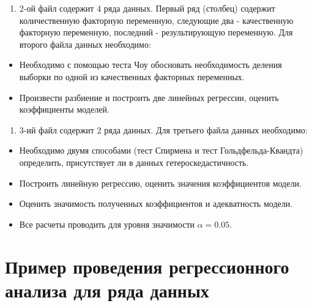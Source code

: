 \documentclass[
]{article}
\providecommand{\tightlist}{%
  \setlength{\itemsep}{0pt}\setlength{\parskip}{0pt}}
\begin{document}
\begin{enumerate}
\def\labelenumi{\arabic{enumi}.}
\setcounter{enumi}{1}
\tightlist
\item
  2-ой файл содержит 4 ряда данных. Первый ряд (столбец) содержит
  количественную факторную переменную, следующие два - качественную
  факторную переменную, последний - результирующую переменную. Для
  второго файла данных необходимо:
\end{enumerate}

\begin{itemize}
\item
  Необходимо с помощью теста Чоу обосновать необходимость деления
  выборки по одной из качественных факторных переменных.
\item
  Произвести разбиение и построить две линейных регрессии, оценить
  коэффициенты моделей.
\end{itemize}

\begin{enumerate}
\def\labelenumi{\arabic{enumi}.}
\setcounter{enumi}{2}
\tightlist
\item
  3-ий файл содержит 2 ряда данных. Для третьего файла данных
  необходимо:
\end{enumerate}

\begin{itemize}
\item
  Необходимо двумя способами (тест Спирмена и тест Гольдфельда-Квандта)
  определить, присутствует ли в данных гетероскедастичность.
\item
  Построить линейную регрессию, оценить значения коэффициентов модели.
\item
  Оценить значимость полученных коэффициентов и адекватность модели.
\item
  Все расчеты проводить для уровня значимости \(\alpha = 0.05\).
\end{itemize}

\hypertarget{ux43fux440ux438ux43cux435ux440-ux43fux440ux43eux432ux435ux434ux435ux43dux438ux44f-ux440ux435ux433ux440ux435ux441ux441ux438ux43eux43dux43dux43eux433ux43e-ux430ux43dux430ux43bux438ux437ux430-ux434ux43bux44f-ux440ux44fux434ux430-ux434ux430ux43dux43dux44bux445}{%
\section{\texorpdfstring{\textbf{Пример проведения регрессионного
анализа для ряда
данных}}{Пример проведения регрессионного анализа для ряда данных}}\label{ux43fux440ux438ux43cux435ux440-ux43fux440ux43eux432ux435ux434ux435ux43dux438ux44f-ux440ux435ux433ux440ux435ux441ux441ux438ux43eux43dux43dux43eux433ux43e-ux430ux43dux430ux43bux438ux437ux430-ux434ux43bux44f-ux440ux44fux434ux430-ux434ux430ux43dux43dux44bux445}}
\end{document}
